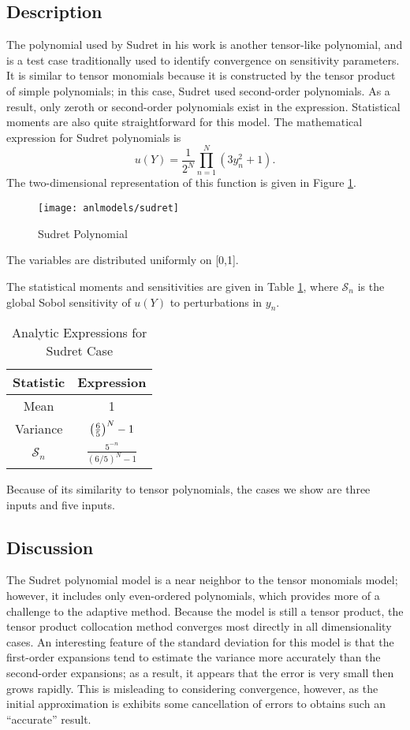 \subsection{Description}
The polynomial used by Sudret in his work \cite{sudret} is another tensor-like polynomial, and is a test case traditionally used to
identify convergence on sensitivity parameters.  It is similar to tensor monomials because it is constructed by the tensor
product of simple polynomials; in this case, Sudret used second-order polynomials.  As a result, only zeroth or second-order
polynomials exist in the expression.  Statistical moments are also quite straightforward for this model.
The mathematical expression for Sudret polynomials is
\begin{equation}
  u(Y) = \frac{1}{2^N}\prod_{n=1}^N (3y_n^2+1).
\end{equation}
The two-dimensional representation of this function is given in Figure \ref{fig: sudret}.
\begin{figure}[htb]
  \centering
  \texttt{[image: anlmodels/sudret]}
  \caption{Sudret Polynomial}
  \label{fig: sudret}
\end{figure}
The variables are distributed uniformly on [0,1].

The statistical moments and sensitivities are given in
Table \ref{tab:sudret}, where $\mathcal{S}_n$ is the global Sobol sensitivity of $u(Y)$ to perturbations in
$y_n$.

\begin{table}[H]
  \centering
  \begin{tabular}{c c}
    Statistic & Expression \\\hline
    Mean & 1 \\
    Variance & $\qty(\frac{6}{5})^N - 1$ \\
    $\mathcal{S}_n$ & $\frac{5^{-n}}{(6/5)^N-1}$
  \end{tabular}
  \caption{Analytic Expressions for Sudret Case}
  \label{tab:sudret}
\end{table}
Because of its similarity to tensor polynomials, the cases we show are three inputs and five inputs.

\subsection{Discussion}
The Sudret polynomial model is a near neighbor to the
tensor monomials model; however, it includes only even-ordered polynomials, which provides more of a challenge
to the adaptive method.  Because the model is still a tensor product, the tensor product collocation method 
converges most directly in all dimensionality cases.  An interesting feature of the standard deviation for
this model is that the first-order expansions tend to estimate the variance more accurately than the
second-order expansions; as a result, it appears that the error is very small then grows rapidly.  This is
misleading to considering convergence, however, as the initial approximation is exhibits some cancellation of
errors to obtains such an ``accurate'' result.

